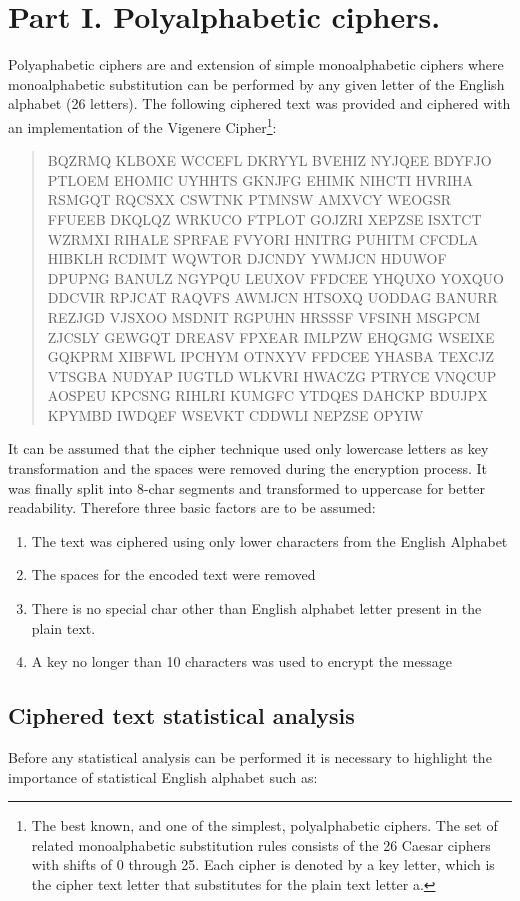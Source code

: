 \documentclass[letterpaper,12pt]{article}
\begin{document}
\section{Part I. Polyalphabetic ciphers.}
Polyaphabetic ciphers are and extension of simple monoalphabetic ciphers where monoalphabetic substitution can be performed by any given letter of the English alphabet (26 letters). The following ciphered text was provided and ciphered with an implementation of the Vigenere Cipher\footnote{The best known, and one of the simplest, polyalphabetic ciphers. The set of related monoalphabetic substitution rules consists of the 26 Caesar ciphers with shifts of 0 through 25. Each cipher is denoted by a key letter, which is the cipher text letter that substitutes for the plain text letter a.\cite{WS2017-Vignere} }: 
\begin{quote}
    BQZRMQ KLBOXE WCCEFL DKRYYL BVEHIZ NYJQEE BDYFJO PTLOEM EHOMIC UYHHTS GKNJFG
EHIMK NIHCTI HVRIHA RSMGQT RQCSXX CSWTNK PTMNSW AMXVCY WEOGSR FFUEEB DKQLQZ
WRKUCO FTPLOT GOJZRI XEPZSE ISXTCT WZRMXI RIHALE SPRFAE FVYORI HNITRG PUHITM
CFCDLA HIBKLH RCDIMT WQWTOR DJCNDY YWMJCN HDUWOF DPUPNG BANULZ NGYPQU
LEUXOV FFDCEE YHQUXO YOXQUO DDCVIR RPJCAT RAQVFS AWMJCN HTSOXQ UODDAG
BANURR REZJGD VJSXOO MSDNIT RGPUHN HRSSSF VFSINH MSGPCM ZJCSLY GEWGQT DREASV
FPXEAR IMLPZW EHQGMG WSEIXE GQKPRM XIBFWL IPCHYM OTNXYV FFDCEE YHASBA TEXCJZ
VTSGBA NUDYAP IUGTLD WLKVRI HWACZG PTRYCE VNQCUP AOSPEU KPCSNG RIHLRI KUMGFC
YTDQES DAHCKP BDUJPX KPYMBD IWDQEF WSEVKT CDDWLI NEPZSE OPYIW
\end{quote}

It can be assumed that the cipher technique used only lowercase letters as key transformation and the spaces were removed during the encryption process. It was finally split into 8-char segments and transformed to uppercase for better readability. Therefore three basic factors are to be assumed:

\begin{enumerate}
    \item The text was ciphered using only lower characters from the English Alphabet
    \item The spaces for the encoded text were removed
    \item There is no special char other than English alphabet letter present in the plain text.
    \item A key no longer than 10 characters was used to encrypt the message
\end{enumerate}

\subsection{Ciphered text statistical analysis}
Before any statistical analysis can be performed it is necessary to highlight the importance of statistical English alphabet such as\cite{lettfreq}:
\end{document}
